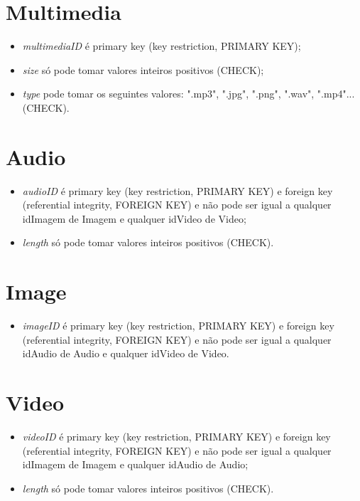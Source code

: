 \documentclass[12pt]{report}
\begin{document}
\section{Multimedia}

\begin{itemize}
    \item \textit{multimediaID} é primary key (key restriction, PRIMARY KEY);
    \item \textit{size} só pode tomar valores inteiros positivos (CHECK);
    \item \textit{type} pode tomar os seguintes valores: ".mp3", ".jpg", ".png", ".wav", ".mp4"... (CHECK).
\end{itemize}

\section{Audio}

\begin{itemize}
    \item \textit{audioID} é primary key (key restriction, PRIMARY KEY) e foreign key (referential integrity, FOREIGN KEY) e não pode ser igual a qualquer idImagem de Imagem e qualquer idVideo de Video;
    \item \textit{length} só pode tomar valores inteiros positivos (CHECK).
\end{itemize}

\section{Image}

\begin{itemize}
    \item \textit{imageID} é primary key (key restriction, PRIMARY KEY) e foreign key (referential integrity, FOREIGN KEY) e não pode ser igual a qualquer idAudio de Audio e qualquer idVideo de Video.
\end{itemize}

\section{Video}

\begin{itemize}
    \item \textit{videoID} é primary key (key restriction, PRIMARY KEY) e foreign key (referential integrity, FOREIGN KEY) e não pode ser igual a qualquer idImagem de Imagem e qualquer idAudio de Audio;
    \item \textit{length} só pode tomar valores inteiros positivos (CHECK).
\end{itemize}
\end{document}
